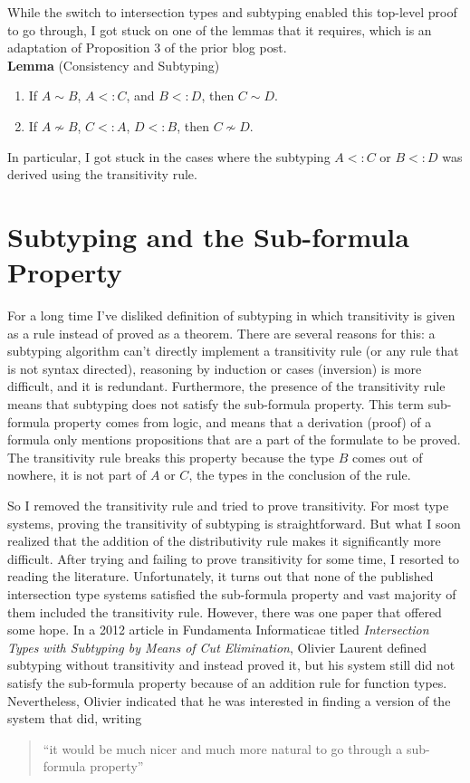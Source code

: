 \documentclass{article}
\begin{document}
While the switch to intersection types and subtyping enabled this
top-level proof to go through, I got stuck on one of the lemmas that
it requires, which is an adaptation of Proposition 3 of the prior blog
post. \\

\noindent \textbf{Lemma} (Consistency and Subtyping)
\begin{enumerate}
\item  If $A \sim B$, $A <: C$, and $B <: D$,
  then $C \sim D$.
\item If $A \not\sim B$, $C <: A$, $D <: B$, then $C \not\sim D$.
\end{enumerate}
In particular, I got stuck in the cases where the subtyping $A <: C$
or $B <: D$ was derived using the transitivity rule.

\section{Subtyping and the Sub-formula Property}

For a long time I've disliked definition of subtyping in which
transitivity is given as a rule instead of proved as a theorem.  There
are several reasons for this: a subtyping algorithm can't directly
implement a transitivity rule (or any rule that is not syntax
directed), reasoning by induction or cases (inversion) is more
difficult, and it is redundant. Furthermore, the presence of the
transitivity rule means that subtyping does not satisfy the sub-formula
property. This term sub-formula property comes from logic, and means
that a derivation (proof) of a formula only mentions propositions that
are a part of the formulate to be proved. The transitivity rule breaks
this property because the type $B$ comes out of nowhere, it is not
part of $A$ or $C$, the types in the conclusion of the rule.

So I removed the transitivity rule and tried to prove transitivity.
For most type systems, proving the transitivity of subtyping is
straightforward. But what I soon realized that the addition of the
distributivity rule makes it significantly more difficult.  After
trying and failing to prove transitivity for some time, I resorted to
reading the literature. Unfortunately, it turns out that none of the
published intersection type systems satisfied the sub-formula property
and vast majority of them included the transitivity rule.  However,
there was one paper that offered some hope.  In a 2012 article in
Fundamenta Informaticae titled \emph{Intersection Types with Subtyping
  by Means of Cut Elimination}, Olivier Laurent defined subtyping
without transitivity and instead proved it, but his system still did
not satisfy the sub-formula property because of an addition rule for
function types. Nevertheless, Olivier indicated that he was interested
in finding a version of the system that did, writing
\begin{quote}
``it would be much nicer and much more natural to go through a
  sub-formula property''
\end{quote}
\end{document}
